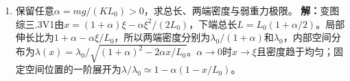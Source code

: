 \documentclass[UTF8,fontset=fandol,a4paper,11pt]{ctexart}
\begin{document}
\begin{enumerate}
\item 保留任意$\alpha=mg/(KL_0)>0$，求总长、两端密度与弱重力极限。
\textbf{解：}变图综三.3V1由$x=(1+\alpha)\xi-\alpha\xi^2/(2L_0)$，下端总长$L=L_0(1+\alpha/2)$。局部伸长比为$1+\alpha-\alpha\xi/L_0$，所以两端密度分别为$\lambda_0/(1+\alpha)$和$\lambda_0$，内部空间分布为$\lambda(x)=\lambda_0/\sqrt{(1+\alpha)^2-2\alpha x/L_0}$。$\alpha\to0$时$x\to\xi$且密度趋于均匀；固定空间位置的一阶展开为$\lambda/\lambda_0\simeq1-\alpha(1-x/L_0)$。
\begin{center}\begin{minipage}{.98\linewidth}\centering
{}
\end{minipage}
\end{center}
\end{enumerate}
\end{document}
